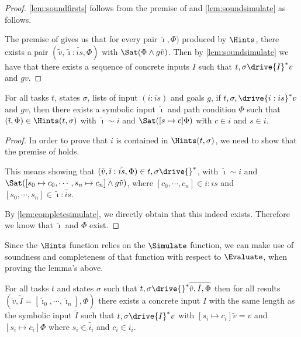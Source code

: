 \begin{proof}
  \cref{lem:soundfirsts} follows from the premise of  and \cref{lem:soundsimulate} as follows.

  The premise of  gives us that for every pair $\tilde{\imath},\Phi)$ produced by $\Hints$,
  there exists a pair $(\tilde{v},\tilde{\imath}:\tilde{is},\Phi)$ with $\Sat(\Phi\land g \tilde{v})$.
  Then by \cref{lem:soundsimulate} we have that there exists a sequence of concrete inputs $I$ such that
  $t,\sigma\drive{I}^*v$ and $g v$.
\end{proof}

\begin{lemma}
  \label{lem:completefirsts}
  For all tasks $t$, states $\sigma$, lists of input $(i:is)$ and goals $g$,
  if $t,\sigma,\drive{i:is}^*v$ and $g v$, then there exists a symbolic input $\tilde{\imath}$ and path condition $\Phi$
  such that $(\tilde{\imath},\Phi)\in\Hints(t,\sigma)$ with $\tilde{\imath}\sim i$ and $\Sat([s\mapsto c]\Phi)$ with $c\in i$ and $s\in i$.
\end{lemma}

\begin{proof}
  In order to prove that $i$ is contained in $\Hints(t,\sigma)$, we need to show that the premise of  holds.

  This means showing that $(\tilde{v},\tilde{\imath}:\tilde{is},\Phi)\in t,\sigma\drive{}^*$, with $\tilde{\imath}\sim i$ and $\Sat([s_0\mapsto c_0,\cdots,s_n\mapsto c_n]\land g\tilde{v})$, where $[c_0,\cdots,c_n]\in i:is$ and $[s_0,\cdots,s_n]\in \tilde{\imath}:\tilde{is}$.

  By \cref{lem:completesimulate}, we directly obtain that this indeed exists. Therefore we know that $\tilde{\imath}$ and $\Phi$ exist.
\end{proof}


Since the $\Hints$ function relies on the $\Simulate$ function, we can make use of soundness and completeness of that function with respect to $\Evaluate$, when proving the lemma's above.

\begin{lemma}
  \label{lem:soundsimulate}
  For all tasks $t$ and states $\sigma$
  such that $t,\sigma\drive{}^*\overline{\tilde{v},\tilde{I},\Phi}$
  then for all results $(\tilde{v},\tilde{I}=[\tilde{\imath}_0,\cdots,\tilde{\imath}_n],\Phi)$
  there exists a concrete input $I$ with the same length as the symbolic input $\tilde{I}$
  such that $t,\sigma\drive{I}^*v$
  with $[s_i\mapsto c_i]\tilde{v}=v$ and $[s_i\mapsto c_i]\Phi$
  where $s_i\in\tilde{i_i}$ and $c_i\in i_i$.
\end{lemma}

